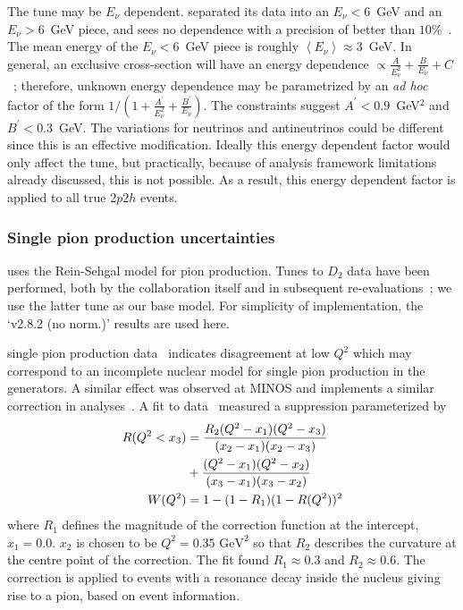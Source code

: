The \minerva tune may be $E_\nu$ dependent. \minerva separated its data into an $E_\nu<6$~GeV and an $E_\nu>$6~GeV piece, and sees no dependence with a precision of better than $10\%$~\cite{Rodrigues:2015hik}.  The mean energy of the $E_\nu<6$~GeV piece is roughly $\left< E_\nu\right>\approx 3$~GeV.  In general, an exclusive cross-section will have an energy dependence $\propto \frac{A}{E_\nu^2}+\frac{B}{E_\nu}+C$~\cite{llewelyn-smith}; therefore, unknown energy dependence may be parametrized by an {\em ad hoc} factor of the form $1/\left(1+ \frac{A^{'}}{E_\nu^2 }+\frac{B^{'}}{E_\nu}\right)$.  The \minerva constraints suggest $A^{'}<0.9$~GeV$^2$ and $B^{'}<0.3$~GeV.  The variations for neutrinos and antineutrinos could be different since this is an effective modification. Ideally this energy dependent factor would only affect the \minerva tune, but practically, because of analysis framework limitations already discussed, this is not possible. As a result, this energy dependent factor is applied to all true $2p2h$ events.

\subsubsection{Single pion production uncertainties}
 uses the Rein-Sehgal model for pion production. Tunes to $D_2$ data have been performed, both by the  collaboration itself and in subsequent re-evaluations~\cite{Rodrigues:2016xjj}; we use the latter tune as our base model. For simplicity of implementation, the `v2.8.2 (no norm.)' results are used here. %

\minerva single pion production data~\cite{Altinok:2017xua,McGivern:2016bwh,Eberly:2014mra} indicates disagreement at low $Q^2$ which may correspond to an incomplete nuclear model for single pion production in the generators. A similar effect was observed at MINOS\cite{Adamson:2014pgc} and \nova implements a similar correction in analyses~\cite{nova_2018}.
A fit to \minerva data~\cite{StowellThesis} measured a suppression parameterized by
\begin{align}
R(Q^2<x_3) & = \frac{R_{2} (Q^2-x_1)(Q^2-x_3)}{(x_2-x_1)(x_2-x_3)} \notag\\
             & + \frac{(Q^2-x_1)(Q^2-x_2)}{(x_3-x_1)(x_3-x_2)}  \\
W(Q^{2}) &= 1-(1-R_{1})(1-R(Q^{2}))^{2}
\end{align}
where $R_{1}$ defines the magnitude of the correction function at the intercept, $x_{1}=0.0$. $x_{2}$ is chosen to be $Q^2=0.35\text{ GeV}^2$ so that $R_{2}$ describes the curvature at the centre point of the correction. The fit found $R_1\approx0.3$ and $R_2\approx0.6$. The correction is applied to events with a resonance decay inside the nucleus giving rise to a pion, based on  event information.


